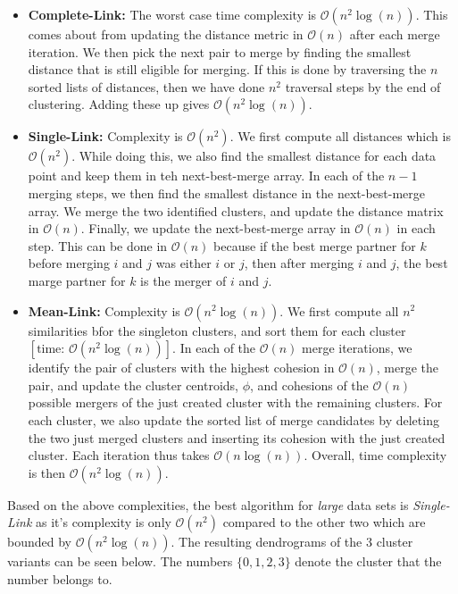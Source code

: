 \documentclass[11pt]{article}
\newcommand{\BigO}[1]{\mathcal{O}\left( #1 \right)}
\begin{document}
\begin{itemize}
  \item {\bf Complete-Link:} The worst case time complexity is $\BigO{n^{2}\log(n)}$. This comes about from updating the distance metric in $\BigO{n}$ after each merge iteration. We then pick the next pair to merge by finding the smallest distance that is still eligible for merging. If this is done by traversing the $n$ sorted lists of distances, then we have done $n^{2}$ traversal steps by the end of clustering. Adding these up gives $\BigO{n^{2}\log(n)}$.
    \item {\bf Single-Link:} Complexity is $\BigO{n^{2}}$. We first compute all distances which is $\BigO{n^{2}}$. While doing this, we also find the smallest distance for each data point and keep them in teh next-best-merge array. In each of the $n-1$ merging steps, we then find the smallest distance in the next-best-merge array. We merge the two identified clusters, and update the distance matrix in $\BigO{n}$. Finally, we update the next-best-merge array in $\BigO{n}$ in each step. This can be done in $\BigO{n}$ because if the best merge partner for $k$ before merging $i$ and $j$ was either $i$ or $j$, then after merging $i$ and $j$, the best marge partner for $k$ is the merger of $i$ and $j$.
    \item {\bf Mean-Link:} Complexity is $\BigO{n^{2}\log(n)}$. We first compute all $n^{2}$ similarities bfor the singleton clusters, and sort them for each cluster $\left[\text{time: }\BigO{n^{2}\log(n)}\right]$. In each of the $\BigO{n}$ merge iterations, we identify the pair of clusters with the highest cohesion in $\BigO{n}$, merge the pair, and update the cluster centroids, $\phi$, and cohesions of the $\BigO{n}$ possible mergers of the just created cluster with the remaining clusters. For each cluster, we also update the sorted list of merge candidates by deleting the two just merged clusters and inserting its cohesion with the just created cluster. Each iteration thus takes $\BigO{n\log(n)}$. Overall, time complexity is then $\BigO{n^{2}\log(n)}$.
\end{itemize}

Based on the above complexities, the best algorithm for {\em large} data sets is {\em Single-Link} as it's complexity is only $\BigO{n^{2}}$ compared to the other two which are bounded by $\BigO{n^{2}\log(n)}$. The resulting dendrograms of the 3 cluster variants can be seen below. The numbers $\{0, 1, 2, 3\}$ denote the cluster that the number belongs to.
\end{document}
